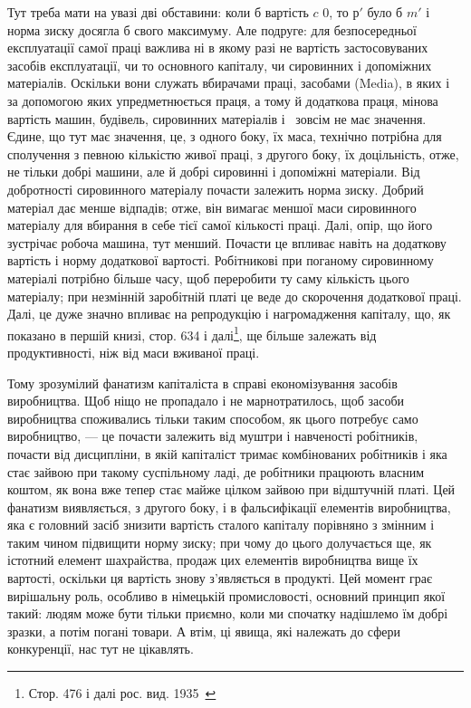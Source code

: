 Тут треба мати на увазі дві обставини: коли б вартість $c$ \deq{} 0,
то $р'$ було б \deq{} $m'$ і норма зиску досягла б свого максимуму.
Але подруге: для безпосередньої експлуатації самої праці важлива
ні в якому разі не вартість застосовуваних засобів експлуатації,
чи то основного капіталу, чи сировинних і допоміжних
матеріалів. Оскільки вони служать вбирачами праці, засобами
(Media), в яких і за допомогою яких упредметнюється праця,
а тому й додаткова праця, мінова вартість машин, будівель,
сировинних матеріалів і~ зовсім не має значення. Єдине, що
тут має значення, це, з одного боку, їх маса, технічно потрібна
для сполучення з певною кількістю живої праці, з другого боку,
їх доцільність, отже, не тільки добрі машини, але й добрі сировинні
і допоміжні матеріали. Від добротності сировинного матеріалу
почасти залежить норма зиску. Добрий матеріал дає менше
відпадів; отже, він вимагає меншої маси сировинного матеріалу
для вбирання в себе тієї самої кількості праці. Далі, опір, що
його зустрічає робоча машина, тут менший. Почасти це впливає
навіть на додаткову вартість і норму додаткової вартості. Робітникові
при поганому сировинному матеріалі потрібно більше
часу, щоб переробити ту саму кількість цього матеріалу; при
незмінній заробітній платі це веде до скорочення додаткової
праці. Далі, це дуже значно впливає на репродукцію і нагромадження
капіталу, що, як показано в першій книзі, стор. 634
і далі\footnote*{
Стор. 476 і далі рос. вид. 1935~ 
}, ще більше залежать від продуктивності, ніж від маси вживаної
праці.

Тому зрозумілий фанатизм капіталіста в справі економізування
засобів виробництва. Щоб ніщо не пропадало і не марнотратилось,
щоб засоби виробництва споживались тільки таким
способом, як цього потребує само виробництво, — це почасти
залежить від муштри і навченості робітників, почасти від дисципліни,
в якій капіталіст тримає комбінованих робітників і яка стає
зайвою при такому суспільному ладі, де робітники працюють
власним коштом, як вона вже тепер стає майже цілком зайвою
при відштучній платі. Цей фанатизм виявляється, з другого боку,
і в фальсифікації елементів виробництва, яка є головний засіб
знизити вартість сталого капіталу порівняно з змінним і таким
чином підвищити норму зиску; при чому до цього долучається
ще, як істотний елемент шахрайства, продаж цих елементів
виробництва вище їх вартості, оскільки ця вартість знову з’являється
в продукті. Цей момент грає вирішальну роль, особливо
в німецькій промисловості, основний принцип якої такий: людям
може бути тільки приємно, коли ми спочатку надішлемо їм добрі
зразки, а потім погані товари. А втім, ці явища, які належать до
сфери конкуренції, нас тут не цікавлять.

